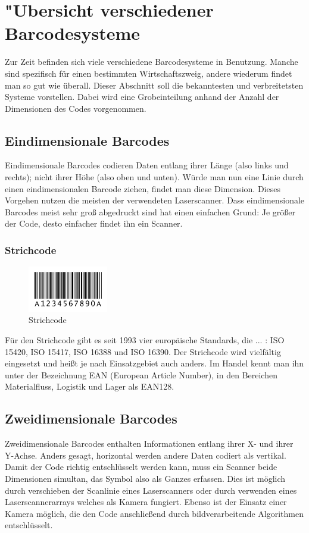 \section{"Ubersicht verschiedener Barcodesysteme}
Zur Zeit befinden sich viele verschiedene Barcodesysteme in Benutzung. Manche sind spezifisch für einen bestimmten Wirtschaftszweig, andere wiederum findet man so gut wie überall. Dieser Abschnitt soll die bekanntesten und verbreitetsten Systeme vorstellen. Dabei wird eine Grobeinteilung anhand der Anzahl der Dimensionen des Codes vorgenommen.

\subsection{Eindimensionale Barcodes}
Eindimensionale Barcodes codieren Daten entlang ihrer Länge (also links und rechts); nicht ihrer Höhe (also oben und unten). Würde man nun eine Linie durch einen eindimensionalen Barcode ziehen, findet man diese Dimension. Dieses Vorgehen nutzen die meisten der verwendeten Laserscanner. Dass eindimensionale Barcodes meist sehr groß abgedruckt sind hat einen einfachen Grund: Je größer der Code, desto einfacher findet ihn ein Scanner.

\subsubsection{Strichcode}
\begin{figure}[htbp]
	\centering
\includegraphics[height=2cm]{Bilder/Barcode.png}
	\caption{Strichcode}
	\label{barcode}
\end{figure}
Für den Strichcode gibt es seit 1993 vier europäische Standards, die ... : ISO 15420, ISO 15417, ISO 16388 und ISO 16390.
Der Strichcode wird vielfältig eingesetzt und heißt je nach Einsatzgebiet auch anders. Im Handel kennt man ihn unter der Bezeichnung EAN (European Article Number), in den Bereichen Materialfluss, Logistik und Lager als EAN128.

\subsection{Zweidimensionale Barcodes}
Zweidimensionale Barcodes enthalten Informationen entlang ihrer X- und ihrer Y-Achse. Anders gesagt, horizontal werden andere Daten codiert als vertikal.
Damit der Code richtig entschlüsselt werden kann, muss ein Scanner beide Dimensionen simultan, das Symbol also als Ganzes erfassen. Dies ist möglich durch verschieben der Scanlinie eines Laserscanners oder durch verwenden eines Laserscannerarrays welches als Kamera fungiert. Ebenso ist der Einsatz einer Kamera möglich, die den Code anschließend durch bildverarbeitende Algorithmen entschlüsselt.

